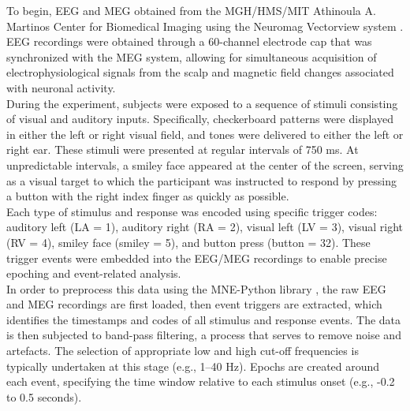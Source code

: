 \noindent To begin, EEG and MEG obtained from the MGH/HMS/MIT Athinoula A. Martinos Center for Biomedical Imaging using the Neuromag Vectorview system \cite{Gramfort2020-jm}. EEG recordings were obtained through a 60-channel electrode cap that was synchronized with the MEG system, allowing for simultaneous acquisition of electrophysiological signals from the scalp and magnetic field changes associated with neuronal activity. \\


\noindent During the experiment, subjects were exposed to a sequence of stimuli consisting of visual and auditory inputs. Specifically, checkerboard patterns were displayed in either the left or right visual field, and tones were delivered to either the left or right ear. These stimuli were presented at regular intervals of 750 ms. At unpredictable intervals, a smiley face appeared at the center of the screen, serving as a visual target to which the participant was instructed to respond by pressing a button with the right index finger as quickly as possible.\\

\noindent Each type of stimulus and response was encoded using specific trigger codes: auditory left (LA = 1), auditory right (RA = 2), visual left (LV = 3), visual right (RV = 4), smiley face (smiley = 5), and button press (button = 32). These trigger events were embedded into the EEG/MEG recordings to enable precise epoching and event-related analysis.\\

\noindent In order to preprocess this data using the MNE-Python library \cite{gramfort2014mne}, the raw EEG and MEG recordings are first loaded, then event triggers are extracted, which identifies the timestamps and codes of all stimulus and response events. The data is then subjected to band-pass filtering, a process that serves to remove noise and artefacts. The selection of appropriate low and high cut-off frequencies is typically undertaken at this stage (e.g., 1–40 Hz). Epochs are created around each event, specifying the time window relative to each stimulus onset (e.g., -0.2 to 0.5 seconds).\\

